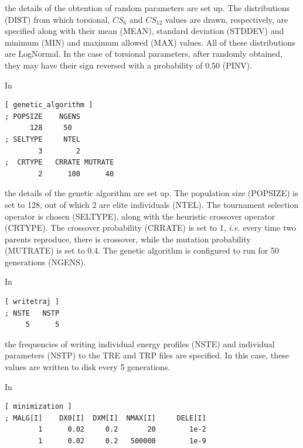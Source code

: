 \documentclass[10pt,a4paper,openany]{memoir}
\numberwithin{equation}{section}
\begin{document}
\noindent the details of the obtention of random parameters are set
up.
%
The distributions (DIST) from which torsional, $CS_6$ and $CS_{12}$
values are drawn, respectively, are specified along with their mean
(MEAN), standard deviation (STDDEV) and minimum (MIN) and maximum
allowed (MAX) values.
%
All of these distributions are LogNormal.
%
In the case of torsional parameters, after randomly obtained, they may
have their sign reversed with a probability of 0.50 (PINV).

In 

\begin{lstlisting}[language=gromacs]
[ genetic_algorithm ]
; POPSIZE    NGENS
      128     50
; SELTYPE     NTEL
        3        2
;  CRTYPE   CRRATE MUTRATE
        2      100      40
\end{lstlisting}\vspace{1ex}\par

\noindent the details of the genetic algorithm are set up.
%
The population size (POPSIZE) is set to 128, out of which 2 are elite
individuals (NTEL).
%
The tournament selection operator is chosen (SELTYPE), along with the
heuristic crossover operator (CRTYPE).
%
The crossover probability (CRRATE) is set to 1, \textit{i.e.} every
time two parents reproduce, there is crossover, while the mutation
probability (MUTRATE) is set to 0.4.
%
The genetic algorithm is configured to run for 50 generations (NGENS).

In

\begin{lstlisting}[language=gromacs]
[ writetraj ]
; NSTE   NSTP
     5      5
\end{lstlisting}\vspace{1ex}\par

\noindent the frequencies of writing individual energy profiles (NSTE)
and individual parameters (NSTP) to the TRE and TRP files are
specified.
%
In this case, these values are written to disk every 5 generations.

In

\begin{lstlisting}[language=gromacs]
[ minimization ]
; MALG[I]    DX0[I]  DXM[I]  NMAX[I]     DELE[I]
        1      0.02     0.2       20        1e-2
        1      0.02     0.2   500000        1e-9

\end{lstlisting}\vspace{1ex}\par
\end{document}
